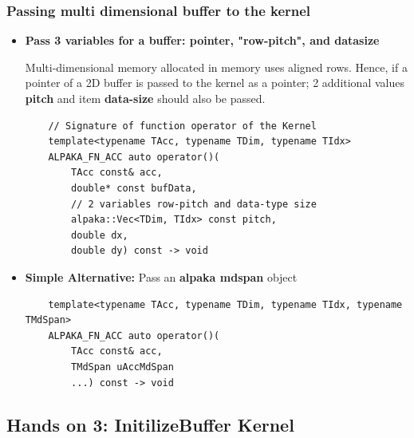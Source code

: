 \documentclass[9pt]{beamer}
\begin{document}
\begin{frame}[fragile]
\small
\frametitle{Passing multi dimensional buffer to the kernel}
 \begin{itemize}
 \item \textbf{Pass 3 variables for a buffer: pointer,  "row-pitch", and datasize}

Multi-dimensional memory allocated in memory uses aligned rows.
Hence, if a pointer of a 2D buffer is passed to the kernel as a pointer; 2 additional values \textbf{pitch} and item \textbf{data-size} should also be passed.

        \lstset{basicstyle=\ttfamily\scriptsize}
        \begin{lstlisting}
    // Signature of function operator of the Kernel
    template<typename TAcc, typename TDim, typename TIdx>
    ALPAKA_FN_ACC auto operator()(
        TAcc const& acc,
        double* const bufData,
        // 2 variables row-pitch and data-type size
        alpaka::Vec<TDim, TIdx> const pitch,
        double dx,
        double dy) const -> void
        \end{lstlisting}

        \hspace{-0.2\baselineskip}


\item \textbf{Simple Alternative:} Pass an \textbf{alpaka mdspan} object
\lstset{basicstyle=\ttfamily\scriptsize}
\begin{lstlisting}
    template<typename TAcc, typename TDim, typename TIdx, typename TMdSpan>
    ALPAKA_FN_ACC auto operator()(
        TAcc const& acc,
        TMdSpan uAccMdSpan
        ...) const -> void
\end{lstlisting}
\end{itemize}
\end{frame}



\subsection{Hands on 3: InitilizeBuffer Kernel}
\end{document}
